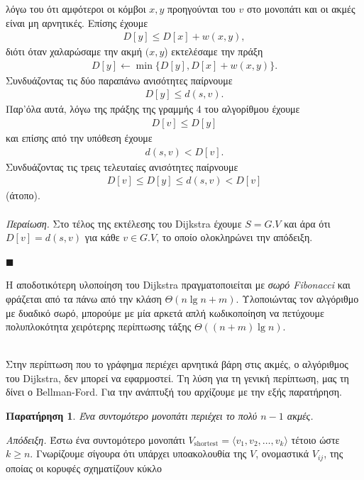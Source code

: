 \documentclass{article}
\newcommand{\sectiontitle}[1]{%
  \vspace{1.5em}%
  \noindent{\Large\bfseries\emph{#1}}\par%
  \vspace{0.5em}%
}
\newtheorem{obs}{Παρατήρηση}
\begin{document}
λόγω του ότι αμφότεροι οι κόμβοι $x, y$ προηγούνται του $v$ στο μονοπάτι και οι ακμές είναι μη αρνητικές.
Επίσης έχουμε 
\begin{align*}
    D[y] \leq D[x] + w(x, y),
\end{align*}
διότι όταν χαλαρώσαμε την ακμή $(x, y$) εκτελέσαμε την πράξη
\begin{align*}
    D[y] \gets \min\{D[y], D[x] + w(x, y)\}.
\end{align*}
Συνδυάζοντας τις δύο παραπάνω ανισότητες παίρνουμε
\begin{align*}
    D[y] \leq d(s, v).
\end{align*}
Παρ'όλα αυτά, λόγω της πράξης της γραμμής 4 του αλγορίθμου έχουμε 
\begin{align*}
    D[v] \leq D[y]
\end{align*}
και επίσης από την υπόθεση έχουμε
\begin{align*}
    d(s, v) < D[v].
\end{align*}
Συνδυάζοντας τις τρεις τελευταίες ανισότητες παίρνουμε 
\begin{align*}
    D[v] \leq D[y] \leq d(s, v) < D[v]
\end{align*}
(άτοπο).
\\ 
\\
\emph{Περαίωση.} Στο τέλος της εκτέλεσης του Dijkstra έχουμε $S = G.V$ και άρα ότι $D[v] = d(s, v)$ για κάθε $v \in G.V$, το οποίο ολοκληρώνει την απόδειξη.
\begin{flushright}
    $\blacksquare$
\end{flushright}
Η αποδοτικότερη υλοποίηση του Dijkstra πραγματοποιείται με \emph{σωρό Fibonacci} και φράζεται από τα πάνω από την κλάση $\Theta(n \lg n + m)$. Υλοποιώντας τον αλγόριθμο με δυαδικό σωρό, μπορούμε με μία αρκετά απλή κωδικοποίηση 
να πετύχουμε πολυπλοκότητα χειρότερης περίπτωσης τάξης $\Theta((n + m) \lg n)$.
\\ \\
\sectiontitle{Ο αλγόριθμος των Bellman-Ford}
\noindent
Στην περίπτωση που το γράφημα περιέχει αρνητικά βάρη στις ακμές, ο αλγόριθμος του Dijkstra, δεν μπορεί να εφαρμοστεί. 
Τη λύση για τη γενική περίπτωση, μας τη δίνει ο Bellman-Ford. Για την ανάπτυξή του αρχίζουμε με την εξής παρατήρηση.
\begin{obs}
    Ένα συντομότερο μονοπάτι περιέχει το πολύ $n - 1$ ακμές. \label{n-1}
\end{obs}
\noindent
\emph{Απόδειξη.} Έστω ένα συντομότερο μονοπάτι $V_{\text{shortest}} = \langle v_1, v_2, \dots, v_k\rangle$ τέτοιο ώστε $k \geq n$. Γνωρίζουμε σίγουρα ότι υπάρχει υποακολουθία της $V$, ονομαστικά $V_{ij}$, της οποίας οι κορυφές σχηματίζουν κύκλο 
\end{document}
